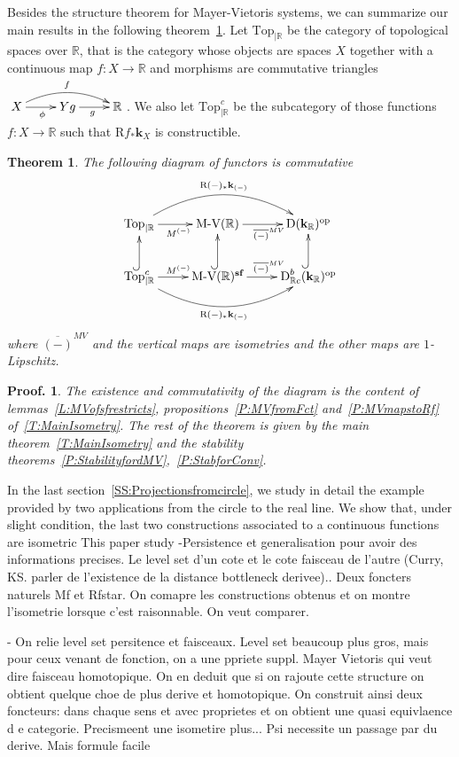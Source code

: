 \documentclass[a4paper, english, 11pt]{article}
\newcommand{\kk}[0]{\textbf{k}}
\newcommand{\0}{\vec{0}}
\newcommand{\R}[0]{\mathbb{R}}
\newcommand{\D}[0]{\text{D}}
\newcommand{\op}[0]{\text{op}}
\newcommand{\Rr}[0]{\text{R}}
\newcommand{\s}{\textbf{sf}}
\newtheorem*{pf}{Proof.} }
\newtheorem{thm}[prop]{Theorem}
\begin{document}
Besides the structure theorem for Mayer-Vietoris systems, we can summarize our main results in the following theorem~\ref{T:MainDiag}.  Let $\mathrm{Top}_{|\R}$ be the category of topological spaces over $\R$, that is the category whose objects are spaces $X$ together with a continuous map  $f:X\to\R$ and morphisms are commutative triangles $\xymatrix{X\ar[r]_{\phi} \ar@/^1pc/[rr]^{f} & Y\ar[r]_g{g} & \R } $. We also let $ \mathrm{Top}^{c}_{|\R} $ be the subcategory of those functions $f:X\to \R$ such that $\Rr f_* \kk_X$ is constructible.
\begin{thm}\label{T:MainDiag} The following diagram of functors is commutative
\[\xymatrix{ \mathrm{Top}_{|\R} \ar[r]_{M^{(-)}} \ar@/^2pc/[rr]^{\Rr(-)_*\kk_{(-)}} &\text{M-V}(\R) \ar[r]_{\quad\overline{(-)}^{MV}} &  \D(\kk_\R)^{\op} \\ 
 \mathrm{Top}^{c}_{|\R} \ar[r]^{M^{(-)}} \ar@{^{(}->}[u] \ar@/_2pc/[rr]_{\Rr(-)_*\kk_{(-)}}&\text{M-V}(\R)^{\s} \ar@{^{(}->}[u]\ar[r]^{\quad\overline{(-)}^{MV}} & \D^b_{\R c}(\kk_\R)^{\op} \ar@{^{(}->}[u] }  \] where $\overline{(-)}^{MV}$ and the vertical maps are isometries and the other maps are $1$-Lipschitz.
\end{thm}
\begin{pf}
 The existence and commutativity of the diagram is the content of lemmas~\ref{L:MVofsfrestricts}, propositions~\ref{P:MVfromFct} and~\ref{P:MVmapstoRf} of~\ref{T:MainIsometry}. The rest of the theorem is given by the main theorem~\ref{T:MainIsometry} and the stability theorems~\ref{P:StabilityfordMV},~\ref{P:StabforConv}.
\end{pf}
In the last section~\ref{SS:Projectionsfromcircle}, we study in detail the example provided by two applications from the circle to the real line.  
We show that, under slight condition, the last two constructions associated to a continuous functions are isometric
This paper study 
-Persistence et generalisation pour avoir des informations precises. Le level set d'un cote et le cote faisceau de l'autre (Curry, KS. parler de l'existence de la distance bottleneck derivee).. Deux foncters naturels Mf et Rfstar. On comapre les constructions obtenus et on montre l'isometrie lorsque c'est raisonnable. On veut comparer.

- On relie level set persitence et faisceaux. Level set beaucoup plus gros, mais pour ceux venant de fonction, on a une ppriete suppl. Mayer Vietoris qui veut dire faisceau homotopique. On en deduit que si on rajoute cette structure on obtient quelque choe de plus derive et homotopique. On construit ainsi deux foncteurs: dans chaque sens et avec proprietes et on obtient une quasi equivlaence d e categorie. Precismeent une isometire plus... Psi necessite un passage par du derive. Mais formule facile
\end{document}
